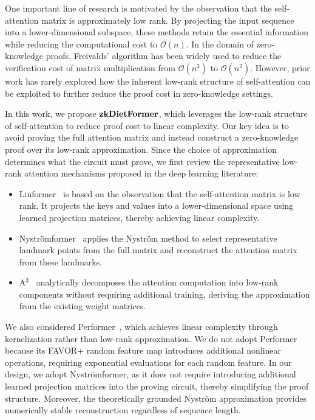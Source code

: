 \documentclass[sigconf,anonymous,review,balance=false]{acmart}
\newcommand{\rev}[1]{{\color{magenta}#1}}
\begin{document}
One important line of research is motivated by the observation that the self-attention matrix is approximately low rank. By projecting the input sequence into a lower-dimensional subspace, these methods retain the essential information while reducing the computational cost to \rev{$\mathcal{O}(n)$}.
In the domain of zero-knowledge proofs, Freivalds’ algorithm has been widely used to reduce the verification cost of matrix multiplication from \rev{$\mathcal{O}(n^3)$} to \rev{$\mathcal{O}(n^2)$}. However, prior work has rarely explored how the inherent low-rank structure of self-attention can be exploited to further reduce the proof cost in zero-knowledge settings.

In this work, we propose ${\bf zkDietFormer}$, which leverages the low-rank structure of self-attention to reduce proof cost to linear complexity. Our key idea is to avoid proving the full attention matrix and instead construct a zero-knowledge proof over its low-rank approximation. Since the choice of approximation determines what the circuit must prove, we first review the representative low-rank attention mechanisms proposed in the deep learning literature:

\begin{itemize}
    \item Linformer~\cite{Linformer} is based on the observation that the self-attention matrix is low rank. It projects the keys and values into a lower-dimensional space using learned projection matrices, thereby achieving linear complexity.
    \item Nyströmformer~\cite{Nystromformer} applies the Nyström method to select representative landmark points from the full matrix and reconstruct the attention matrix from these landmarks.
    \item A$^3$~\cite{A3} analytically decomposes the attention computation into low-rank components without requiring additional training, deriving the approximation from the existing weight matrices.
\end{itemize}

We also considered Performer~\cite{Performer}, which achieves linear complexity through kernelization rather than low-rank approximation. We do not adopt Performer because its FAVOR+ random feature map introduces additional nonlinear operations, requiring exponential evaluations for each random feature. 
In our design, we adopt Nyströmformer, as it does not require introducing additional learned projection matrices into the proving circuit, thereby simplifying the proof structure. Moreover, the theoretically grounded Nyström approximation provides numerically stable reconstruction regardless of sequence length.
\end{document}

